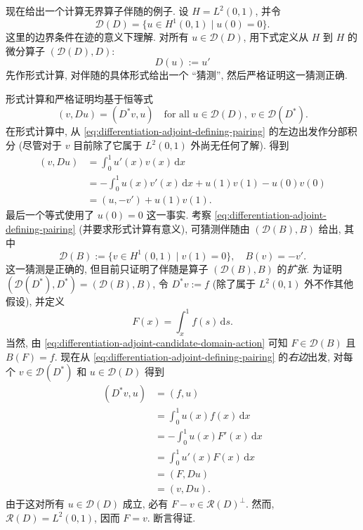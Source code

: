\begin{Example}
\label{ex:differentiation-hilbert-adjoint-complete-calculation}
现在给出一个计算无界算子伴随的例子. 设 $H=L^2(0,1)$, 并令\[\mathcal{D}(D)=\{u\in H^1(0,1)\mid u(0)=0\}.\]这里的边界条件在迹的意义下理解. 对所有 $u\in\mathcal{D}(D)$, 用下式定义从 $H$ 到 $H$ 的微分算子 $(\mathcal{D}(D),D)$:\[D(u):=u'\]先作形式计算, 对伴随的具体形式给出一个 ``猜测'', 然后严格证明这一猜测正确.

形式计算和严格证明均基于恒等式
\begin{equation}\label{eq:differentiation-adjoint-defining-pairing}
(v,Du)=(D^*v,u)\quad\text{for all }u\in\mathcal{D}(D),\ v\in\mathcal{D}(D^*).
\end{equation}
在形式计算中, 从 \eqref{eq:differentiation-adjoint-defining-pairing} 的左边出发作分部积分 (尽管对于 $v$ 目前除了它属于 $L^2(0,1)$ 外尚无任何了解). 得到\[\begin{aligned}
(v,Du)&=\int_0^1u'(x)v(x)\,\mathrm{d}x\\
&=-\int_0^1u(x)v'(x)\,\mathrm{d}x+u(1)v(1)-u(0)v(0)\\
&=(u,-v')+u(1)v(1).
\end{aligned}\]最后一个等式使用了 $u(0)=0$ 这一事实. 考察 \eqref{eq:differentiation-adjoint-defining-pairing} (并要求形式计算有意义), 可猜测伴随由 $(\mathcal{D}(B),B)$ 给出, 其中
\begin{equation}\label{eq:differentiation-adjoint-candidate-domain-action}
\mathcal{D}(B):=\{v\in H^1(0,1)\mid v(1)=0\},\quad B(v)=-v'.
\end{equation}
这一猜测是正确的, 但目前只证明了伴随是算子 $(\mathcal{D}(B),B)$ 的\emph{扩张}. 为证明 $(\mathcal{D}(D^*),D^*)=(\mathcal{D}(B),B)$, 令 $D^*v:=f$ (除了属于 $L^2(0,1)$ 外不作其他假设), 并定义
\begin{equation}\label{eq:differentiation-adjoint-antiderivative}
F(x)=\int_x^1f(s)\,\mathrm{d}s.
\end{equation}
当然, 由 \eqref{eq:differentiation-adjoint-candidate-domain-action} 可知 $F\in\mathcal{D}(B)$ 且 $B(F)=f$. 现在从 \eqref{eq:differentiation-adjoint-defining-pairing} 的\emph{右边}出发, 对每个 $v\in\mathcal{D}(D^*)$ 和 $u\in\mathcal{D}(D)$ 得到\[\begin{aligned}
(D^*v,u)&=(f,u)\\
&=\int_0^1u(x)f(x)\,\mathrm{d}x\\
&=-\int_0^1u(x)F'(x)\,\mathrm{d}x\\
&=\int_0^1u'(x)F(x)\,\mathrm{d}x\\
&=(F,Du)\\
&=(v,Du).
\end{aligned}\]由于这对所有 $u\in\mathcal{D}(D)$ 成立, 必有 $F-v\in\mathcal{R}(D)^\perp$. 然而, $\mathcal{R}(D)=L^2(0,1)$, 因而 $F=v$. 断言得证.
\end{Example}

